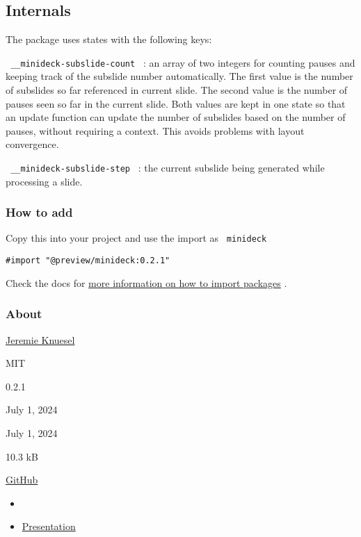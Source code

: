 \subsection{Internals}\label{internals}

The package uses states with the following keys:

\texttt{\ \_\_minideck-subslide-count\ } : an array of two integers for
counting pauses and keeping track of the subslide number automatically.
The first value is the number of subslides so far referenced in current
slide. The second value is the number of pauses seen so far in the
current slide. Both values are kept in one state so that an update
function can update the number of subslides based on the number of
pauses, without requiring a context. This avoids problems with layout
convergence.

\texttt{\ \_\_minideck-subslide-step\ } : the current subslide being
generated while processing a slide.

\subsubsection{How to add}\label{how-to-add}

Copy this into your project and use the import as \texttt{\ minideck\ }

\begin{verbatim}
#import "@preview/minideck:0.2.1"
\end{verbatim}



Check the docs for
\href{https://typst.app/docs/reference/scripting/\#packages}{more
information on how to import packages} .

\subsubsection{About}\label{about}

\begin{description}
\tightlist
\item[Author :]
\href{https://github.com/knuesel}{Jeremie Knuesel}
\item[License:]
MIT
\item[Current version:]
0.2.1
\item[Last updated:]
July 1, 2024
\item[First released:]
July 1, 2024
\item[Archive size:]
10.3 kB
\href{https://packages.typst.org/preview/minideck-0.2.1.tar.gz}{\pandocbounded{}}
\item[Repository:]
\href{https://github.com/knuesel/typst-minideck}{GitHub}
\item[Categor y :]
\begin{itemize}
\tightlist
\item[]
\item
  \pandocbounded{}
  \href{https://typst.app/universe/search/?category=presentation}{Presentation}
\end{itemize}
\end{description}

